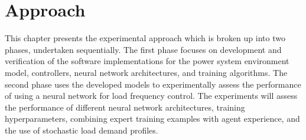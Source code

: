 \chapter{Approach}
This chapter presents the experimental approach which is broken up into two phases, undertaken sequentially. The first phase focuses on development and verification of the software implementations for the power system environment model, controllers, neural network architectures, and training algorithms. The second phase uses the developed models to experimentally assess the performance of using a neural network for load frequency control. The experiments will assess the performance of different neural network architectures, training hyperparameters, combining expert training examples with agent experience, and the use of stochastic load demand profiles.






